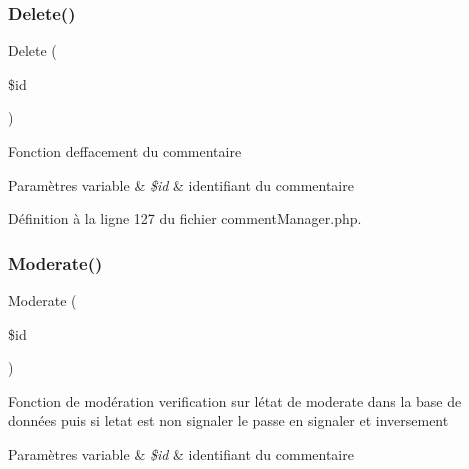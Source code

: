 \mbox{\label{class_src_1_1_managers_1_1comment_manager_a59113b5ecd1d155db6a4f30af34a1e80}} 
\subsubsection{\texorpdfstring{Delete()}{Delete()}}
{\footnotesize\ttfamily Delete (\begin{DoxyParamCaption}\item[{}]{\$id }\end{DoxyParamCaption})}

Fonction d\textquotesingle{}effacement du commentaire 
\begin{DoxyParams}[1]{Paramètres}
variable & {\em \$id} & identifiant du commentaire \\
\hline
\end{DoxyParams}


Définition à la ligne 127 du fichier comment\+Manager.\+php.

\mbox{\label{class_src_1_1_managers_1_1comment_manager_a511df177d885f133ac59c2b68c7046f2}} 
\subsubsection{\texorpdfstring{Moderate()}{Moderate()}}
{\footnotesize\ttfamily Moderate (\begin{DoxyParamCaption}\item[{}]{\$id }\end{DoxyParamCaption})}

Fonction de modération verification sur létat de \textquotesingle{}moderate\textquotesingle{} dans la base de données puis si l\textquotesingle{}etat est non signaler le passe en signaler et inversement 
\begin{DoxyParams}[1]{Paramètres}
variable & {\em \$id} & identifiant du commentaire \\
\hline
\end{DoxyParams}


